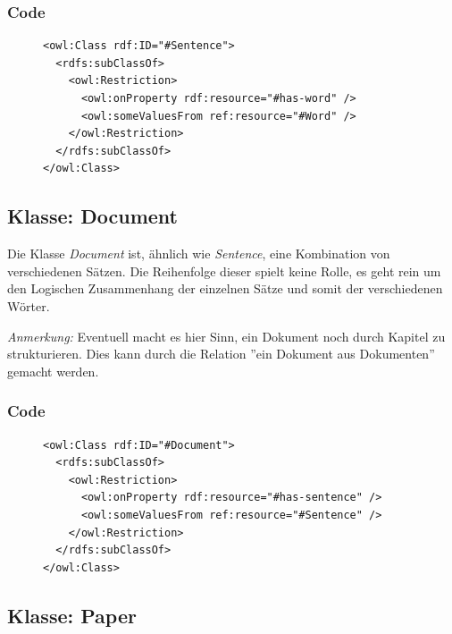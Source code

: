 \documentclass[
    11pt,
    latin1,
    a4paper,
    oneside
]{scrreprt}
\begin{document}
\subsubsection{Code}  \label{sec:class_sentence_code}

\begin{figure}[H]
 \lstset{language=XML}
 \begin{lstlisting}[label=owl:sentence,caption={Die Klasse \emph{Sentence} f\"ugt einzelne W\"orter zu einem Satz zusammen}]
<owl:Class rdf:ID="#Sentence">
  <rdfs:subClassOf>
    <owl:Restriction>
      <owl:onProperty rdf:resource="#has-word" />
      <owl:someValuesFrom ref:resource="#Word" />
    </owl:Restriction>
  </rdfs:subClassOf>
</owl:Class>
 \end{lstlisting}
\end{figure}

\subsection{Klasse: Document} \label{sec:class_document}

Die Klasse \emph{Document} ist, \"ahnlich wie \emph{Sentence}, eine Kombination von verschiedenen S\"atzen. Die Reihenfolge dieser spielt keine Rolle, es geht rein um den Logischen Zusammenhang der einzelnen S\"atze und somit der verschiedenen W\"orter.

\textit{Anmerkung:} Eventuell macht es hier Sinn, ein Dokument noch durch Kapitel zu strukturieren. Dies kann durch die Relation ''ein Dokument aus Dokumenten'' gemacht werden.

\subsubsection{Code}  \label{sec:class_sentence_code}

\begin{figure}[H]
 \lstset{language=XML}
 \begin{lstlisting}[label=owl:document,caption={Die Klasse \emph{Document} f\"ugt einzelne S\"atze zu einem Dokument zusammen}]
<owl:Class rdf:ID="#Document">
  <rdfs:subClassOf>
    <owl:Restriction>
      <owl:onProperty rdf:resource="#has-sentence" />
      <owl:someValuesFrom ref:resource="#Sentence" />
    </owl:Restriction>
  </rdfs:subClassOf>
</owl:Class>
 \end{lstlisting}
\end{figure}


\subsection{Klasse: Paper} \label{sec:class_paper}
\end{document}
